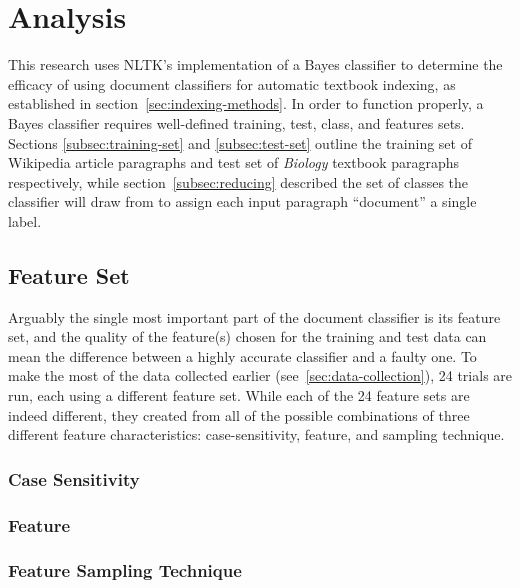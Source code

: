 \section{Analysis}

This research uses NLTK's implementation of a \naive Bayes classifier to determine the efficacy of using document classifiers for automatic textbook indexing, as established in section~\ref{sec:indexing-methods}.
In order to function properly, a \naive Bayes classifier requires well-defined training, test, class, and features sets.
Sections \ref{subsec:training-set} and \ref{subsec:test-set} outline the training set of Wikipedia article paragraphs and test set of {\it Biology} textbook paragraphs respectively, while section~\ref{subsec:reducing} described the set of classes the classifier will draw from to assign each input paragraph  ``document'' a single label.

\subsection{Feature Set}

Arguably the single most important part of the document classifier is its feature set, and the quality of the feature(s) chosen for the training and test data can mean the difference between a highly accurate classifier and a faulty one.
To make the most of the data collected earlier (see~\ref{sec:data-collection}), 24 trials are run, each using a different feature set.
While each of the 24 feature sets are indeed different, they created from all of the possible combinations of three different feature characteristics: case-sensitivity, feature, and sampling technique.

\subsubsection{Case Sensitivity}

\subsubsection{Feature}


\subsubsection{Feature Sampling Technique}

